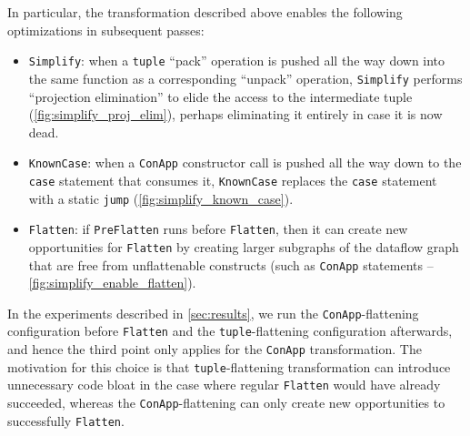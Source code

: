 In particular, the transformation described above enables the following
optimizations in subsequent passes:
\begin{itemize}
\item \texttt{Simplify}: when a \texttt{tuple} ``pack'' operation is pushed
all the way down into the same function as a corresponding ``unpack''
operation, \texttt{Simplify} performs ``projection elimination'' to elide the
access to the intermediate tuple (\cref{fig:simplify_proj_elim}), perhaps
eliminating it entirely in case it is now dead.

\item \texttt{KnownCase}: when a \texttt{ConApp} constructor call is pushed all
the way down to the \texttt{case} statement that consumes it, \texttt{KnownCase}
replaces the \texttt{case} statement with a static \texttt{jump}
(\cref{fig:simplify_known_case}).

\item \texttt{Flatten}: if \texttt{PreFlatten} runs before \texttt{Flatten}, then
it can create new opportunities for \texttt{Flatten} by creating larger
subgraphs of the dataflow graph that are free from unflattenable constructs
(such as \texttt{ConApp} statements -- \cref{fig:simplify_enable_flatten}).

\end{itemize}

In the experiments described in \cref{sec:results}, we run
the \texttt{ConApp}-flattening configuration before \texttt{Flatten} and
the \texttt{tuple}-flattening configuration afterwards, and hence the third
point only applies for the \texttt{ConApp} transformation. The motivation for
this choice is that \texttt{tuple}-flattening transformation can introduce
unnecessary code bloat in the case where regular \texttt{Flatten} would have
already succeeded, whereas the \texttt{ConApp}-flattening can only create new
opportunities to successfully \texttt{Flatten}.



